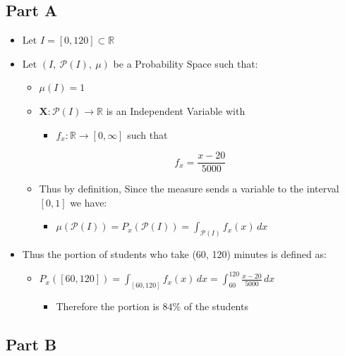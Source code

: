 \documentclass[]{report}
\begin{document}
\subsection{Part A}

\begin{itemize}
	\item Let $I = [0, 120] \subset \mathbb{R}$
	
	\item Let $(I, \ \mathcal{P}(I), \ \mu) $ be a Probability Space such that:
	
	\begin{itemize}
		\item $\mu(I) = 1$
		
		\item $ \mathbf{X} : \mathcal{P}(I) \rightarrow \mathbb{R} $ is an Independent Variable with
		
			\begin{itemize}
				\item $f_{x}: \mathbb{R} \rightarrow [0, \infty]$ such that
			\end{itemize}
			
			$$ f_{x} = \frac{x - 20}{5000} $$
		
		\item Thus by definition, Since the measure sends a variable to the interval $[0, 1]$  we have:
		
		\begin{itemize}
			\item $\mu(\mathcal{P}(I)) = P_{x} (\mathcal{P}(I) ) =  \int_{\mathcal{P}(I)}  f_{x}(x) \, dx$
		\end{itemize}
	\end{itemize}
	
	\item Thus the portion of students who take (60, 120) minutes is defined as:
	
	\begin{itemize}
	\item $P_{x} ([60, 120] ) = \int_{[60, 120]}  f_{x}(x) \, dx =  \int_{60}^{120} \frac{x - 20}{5000} \, dx$
	
	
		\begin{itemize}
			\item Therefore the portion is $84 \% $ of the students
		\end{itemize}
	\end{itemize}
\end{itemize}
	
	\subsection{Part B}
	
\end{document}
